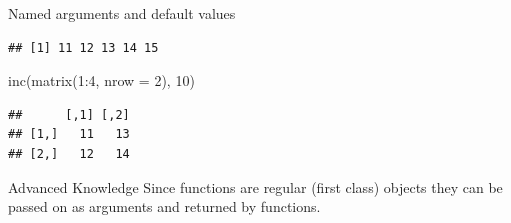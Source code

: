 \documentclass[
  9pt,
  ignorenonframetext,
]{beamer}
\newenvironment{Shaded}{\begin{snugshade}}{\end{snugshade}}
\newcommand{\DataTypeTok}[1]{\textcolor[rgb]{0.87,0.87,0.75}{#1}}
\newcommand{\DecValTok}[1]{\textcolor[rgb]{0.86,0.86,0.80}{#1}}
\newcommand{\KeywordTok}[1]{\textcolor[rgb]{0.94,0.87,0.69}{#1}}
\newcommand{\NormalTok}[1]{\textcolor[rgb]{0.80,0.80,0.80}{#1}}
\newcommand{\OperatorTok}[1]{\textcolor[rgb]{0.94,0.94,0.82}{#1}}
\begin{document}
\begin{frame}[fragile]{Named arguments and default values}
\begin{verbatim}
## [1] 11 12 13 14 15
\end{verbatim}

\begin{Shaded}
\begin{Highlighting}[]
\KeywordTok{inc}\NormalTok{(}\KeywordTok{matrix}\NormalTok{(}\DecValTok{1}\OperatorTok{:}\DecValTok{4}\NormalTok{, }\DataTypeTok{nrow =} \DecValTok{2}\NormalTok{), }\DecValTok{10}\NormalTok{)}
\end{Highlighting}
\end{Shaded}

\begin{verbatim}
##      [,1] [,2]
## [1,]   11   13
## [2,]   12   14
\end{verbatim}

\vfill

\begin{block}{Advanced Knowledge}
\protect\hypertarget{advanced-knowledge}{}
Since functions are regular (first class) objects they can be passed on
as arguments and returned by functions.
\end{block}
\end{frame}
\end{document}
